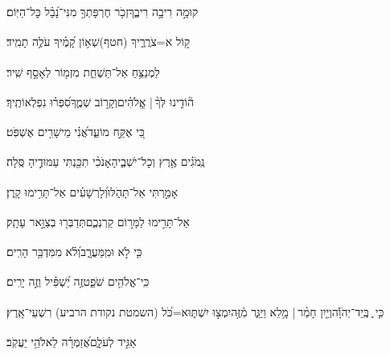 \documentclass[12pt]{article}
\newcommand{\loc}[1]{\textsuperscript{\locf{#1}}}
\begin{document}
{\loc{ כב}~}‏קוּמָ֣ה  רִיבָ֣ה רִיבֶ֑ךָ{\hfill}זְכֹ֥ר חֶרְפָּתְךָ֥ מִנִּי־נָ֝בָ֗ל כׇּל־הַיּֽוֹם׃\par

{\loc{ כג}~}‏ ק֣וֹל א=צֹרֲרֶ֑יךָ (חטף){\hfill}שְׁא֥וֹן קָ֝מֶ֗יךָ עֹלֶ֥ה תָמִֽיד׃\par\pend
\ledpb
\pstart[\subsection*{\textcolor{red}{פרק עה}}]\label{פרק עה}
{\loc{ א}~}‏לַמְנַצֵּ֥חַ אַל־תַּשְׁחֵ֑ת מִזְמ֖וֹר לְאָסָ֣ף שִֽׁיר׃\par

{\loc{ ב}~}‏ה֘וֹדִ֤ינוּ לְּךָ֨ |  אֱֽלֹהִ֗ים{\hfill}\newline\hspace*{.5em}וְקָר֣וֹב שְׁמֶ֑ךָ{\hfill}סִ֝פְּר֗וּ נִפְלְאוֹתֶֽיךָ׃\par

{\loc{ ג}~}‏כִּ֭י אֶקַּ֣ח מוֹעֵ֑ד{\hfill}אֲ֝נִ֗י מֵישָׁרִ֥ים אֶשְׁפֹּֽט׃\par

{\loc{ ד}~}‏נְֽמֹגִ֗ים אֶ֥רֶץ וְכׇל־יֹשְׁבֶ֑יהָ{\hfill}אָנֹכִ֨י תִכַּ֖נְתִּי עַמּוּדֶ֣יהָ סֶּֽלָה׃\par

{\loc{ ה}~}‏אָמַ֣רְתִּי  אַל־תָּהֹ֑לּוּ{\hfill}וְ֝לָרְשָׁעִ֗ים אַל־תָּרִ֥ימוּ קָֽרֶן׃\par

{\loc{ ו}~}‏אַל־תָּרִ֣ימוּ לַמָּר֣וֹם קַרְנְכֶ֑ם{\hfill}תְּדַבְּר֖וּ בְצַוָּ֣אר עָתָֽק׃\par

{\loc{ ז}~}‏כִּ֤י לֹ֣א  וּמִֽמַּעֲרָ֑ב{\hfill}וְ֝לֹ֗א מִמִּדְבַּ֥ר הָרִֽים׃\par

{\loc{ ח}~}‏כִּֽי־אֱלֹהִ֥ים שֹׁפֵ֑ט{\hfill}זֶ֥ה יַ֝שְׁפִּ֗יל וְזֶ֣ה יָרִֽים׃\par

{\loc{ ט}~}‏כִּ֤י ֪ בְּֽיַד־יְהֹוָ֡ה{\hfill}וְיַ֤יִן חָמַ֨ר |  מָ֥לֵא \newline\hspace*{.5em}וַיַּגֵּ֢ר מִ֫זֶּ֥ה{\hfill}\newline\hspace*{.5em}יִמְצ֣וּ יִשְׁתּ֑וּ{\hfill}א=כֹּ֝ל (השמטת נקודת הרביע) רִשְׁעֵי־אָֽרֶץ׃\par

{\loc{ י}~}‏ אַגִּ֣יד לְעֹלָ֑ם{\hfill}אֲ֝זַמְּרָ֗ה לֵאלֹהֵ֥י יַעֲקֹֽב׃\par
\end{document}
